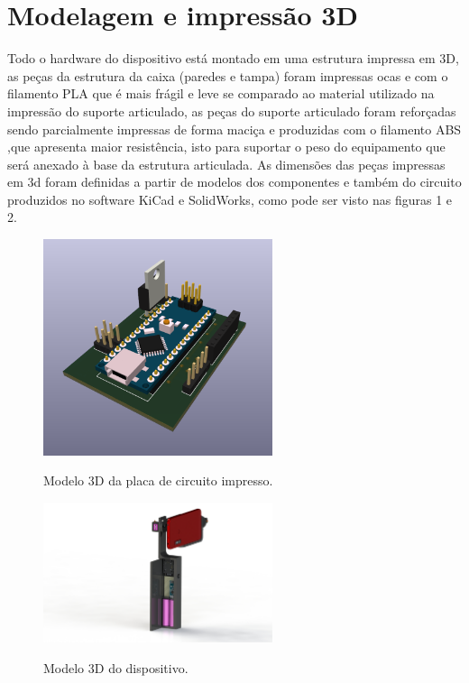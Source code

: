 \section{Modelagem e impressão 3D}
Todo o hardware do dispositivo está montado em uma estrutura impressa em 3D, as peças da estrutura da caixa (paredes e tampa) foram impressas ocas e com o filamento PLA que é mais frágil e leve se comparado ao material utilizado na impressão do suporte articulado, as peças do suporte articulado foram reforçadas sendo parcialmente impressas de forma maciça e produzidas com o filamento ABS ,que apresenta maior resistência, isto para suportar o peso do equipamento que será anexado à base da estrutura articulada. As dimensões das peças impressas em 3d foram definidas a partir de modelos dos componentes e também do circuito produzidos no software KiCad e SolidWorks, como pode ser visto nas figuras 1 e 2. 

\begin{figure}[H]
\centering
\includegraphics[width=0.6\textwidth]{Capitulo2 - Hardware/3D placa.PNG}\\
\caption{\label{fig:widgets}Modelo 3D da placa de circuito impresso.}
\end{figure}

\begin{figure}[H]
\centering
\includegraphics[width=0.6\textwidth]{Capitulo2 - Hardware/versao final.JPG}\\
\caption{\label{fig:widgets}Modelo 3D do dispositivo.}
\end{figure}


